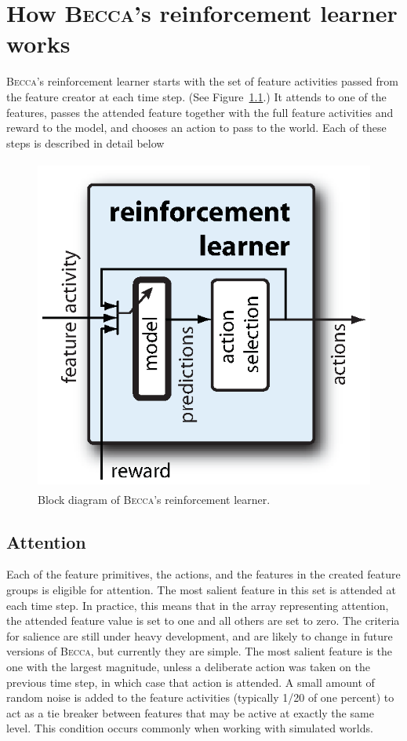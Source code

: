 \chapter{How \textsc{Becca}'s reinforcement learner works}
\label{learner_chapter}


\textsc{Becca}'s reinforcement learner starts with the set of feature activities passed from the feature creator at each time step. (See Figure~\ref{becca_reinforcement_learner}.) It attends to one of the features, passes the attended feature together with the full feature activities and reward to the model, and chooses an action to pass to the world. Each of these steps is described in detail below  

\begin{figure}
\centering
\includegraphics[height=11cm]{figs/becca_reinforcement_learner.eps}
\caption{Block diagram of \textsc{Becca}'s reinforcement learner.}
\label{becca_reinforcement_learner}
\end{figure}

\section{Attention}
Each of the feature primitives, the actions, and the features in the created feature groups is eligible for attention. The most salient feature in this set is attended at each time step. In practice, this means that in the array representing attention, the attended feature value is set to one and all others are set to zero. The criteria for salience are still under heavy development, and are likely to change in future versions of \textsc{Becca}, but currently they are simple. The most salient feature is the one with the largest magnitude, unless a deliberate action was taken on the previous time step, in which case that action is attended. A small amount of random noise is added to the feature activities (typically 1/20 of one percent) to act as a tie breaker between features that may be active at exactly the same level. This condition occurs commonly when working with simulated worlds.

